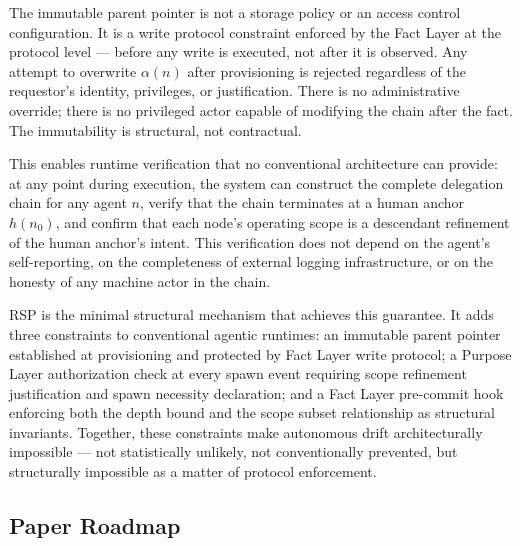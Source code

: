The immutable parent pointer is not a storage policy or an access control configuration. It is a write protocol constraint enforced by the Fact Layer at the protocol level — before any write is executed, not after it is observed. Any attempt to overwrite $\alpha(n)$ after provisioning is rejected regardless of the requestor's identity, privileges, or justification. There is no administrative override; there is no privileged actor capable of modifying the chain after the fact. The immutability is structural, not contractual.

This enables runtime verification that no conventional architecture can provide: at any point during execution, the system can construct the complete delegation chain for any agent $n$, verify that the chain terminates at a human anchor $h(n_0)$, and confirm that each node's operating scope is a descendant refinement of the human anchor's intent. This verification does not depend on the agent's self-reporting, on the completeness of external logging infrastructure, or on the honesty of any machine actor in the chain.

RSP is the minimal structural mechanism that achieves this guarantee. It adds three constraints to conventional agentic runtimes: an immutable parent pointer established at provisioning and protected by Fact Layer write protocol; a Purpose Layer authorization check at every spawn event requiring scope refinement justification and spawn necessity declaration; and a Fact Layer pre-commit hook enforcing both the depth bound and the scope subset relationship as structural invariants. Together, these constraints make autonomous drift architecturally impossible — not statistically unlikely, not conventionally prevented, but structurally impossible as a matter of protocol enforcement.

\subsection{Paper Roadmap}


